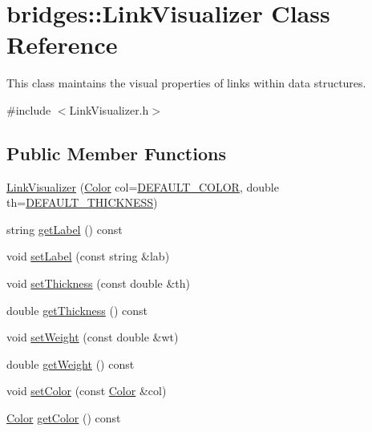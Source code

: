 \hypertarget{classbridges_1_1_link_visualizer}{}\section{bridges\+:\+:Link\+Visualizer Class Reference}
\label{classbridges_1_1_link_visualizer}


This class maintains the visual properties of links within data structures.  




{\ttfamily \#include $<$Link\+Visualizer.\+h$>$}

\subsection*{Public Member Functions}
\begin{DoxyCompactItemize}
\item 
\mbox{\hyperlink{classbridges_1_1_link_visualizer_a598a773822efc55c644462795faf534f}{Link\+Visualizer}} (\mbox{\hyperlink{classbridges_1_1_color}{Color}} col=\mbox{\hyperlink{classbridges_1_1_link_visualizer_a7698ad5b243041377d81152a339d1282}{D\+E\+F\+A\+U\+L\+T\+\_\+\+C\+O\+L\+OR}}, double th=\mbox{\hyperlink{classbridges_1_1_link_visualizer_ab790c33080c769008114db34d5ec8950}{D\+E\+F\+A\+U\+L\+T\+\_\+\+T\+H\+I\+C\+K\+N\+E\+SS}})
\item 
string \mbox{\hyperlink{classbridges_1_1_link_visualizer_a4711364bd9108a03c6867ee2282d9fea}{get\+Label}} () const
\item 
void \mbox{\hyperlink{classbridges_1_1_link_visualizer_a7e590ad57c51ef16a1d46e05ffdf1fb3}{set\+Label}} (const string \&lab)
\item 
void \mbox{\hyperlink{classbridges_1_1_link_visualizer_a92a88e0e4c2f0c8c68f33578743c6502}{set\+Thickness}} (const double \&th)
\item 
double \mbox{\hyperlink{classbridges_1_1_link_visualizer_ae08a5f5fc9e83ea3b3d4ebebc245d3b4}{get\+Thickness}} () const
\item 
void \mbox{\hyperlink{classbridges_1_1_link_visualizer_a08b606d2451026a11e110d0b94f97538}{set\+Weight}} (const double \&wt)
\item 
double \mbox{\hyperlink{classbridges_1_1_link_visualizer_a2c59c476617c2520b4730a14df65400e}{get\+Weight}} () const
\item 
void \mbox{\hyperlink{classbridges_1_1_link_visualizer_adedc1f2b7d5d562b115ef9d8ae19fa73}{set\+Color}} (const \mbox{\hyperlink{classbridges_1_1_color}{Color}} \&col)
\item 
\mbox{\hyperlink{classbridges_1_1_color}{Color}} \mbox{\hyperlink{classbridges_1_1_link_visualizer_a794ab99f7dc3ec9b27961e7f6072181a}{get\+Color}} () const
\end{DoxyCompactItemize}

